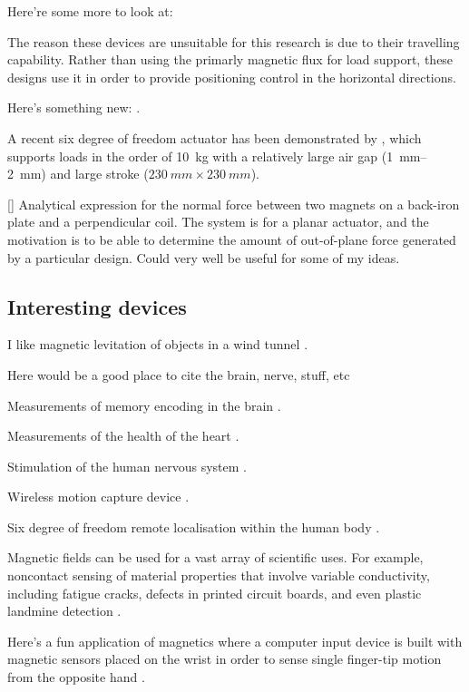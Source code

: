 Here're some more to look at: \textcite{boeij2008,zhang2008a}

The reason these devices are unsuitable for this research is due to their travelling capability.
Rather than using the primarly magnetic flux for load support, these designs use it in order to provide positioning control in the horizontal directions.

Here's something new: \textcite{shameli2008}.

A recent six degree of freedom actuator has been demonstrated by \textcite{jansen2008}, which supports loads in the order of \SI{10}{kg} with a relatively large air gap (\SI{1}{mm}--\SI{2}{mm}) and large stroke ($\SI{230}{mm}\times\SI{230}{mm}$).

[\textcite{dasilveira2005}] Analytical expression for the normal force between two magnets on a back-iron plate and a perpendicular coil.
The system is for a planar actuator, and the motivation is to be able to determine the amount of out-of-plane force generated by a particular design.
Could very well be useful for some of my ideas.

\subsection{Interesting devices}


I like magnetic levitation of objects in a wind tunnel \cite{higuchi2008}.

Here would be a good place to cite the brain, nerve, stuff, etc
\parencite{sekino2005,lu2008,demachi2008}

Measurements of memory encoding in the brain \cite{gjini2005}.

Measurements of the health of the heart \cite{lim2009}.

Stimulation of the human nervous system \cite{darabant2009}.

Wireless motion capture device \cite{hashi2005}.

Six degree of freedom remote localisation within the human body \cite{yang2009-ietm}.

Magnetic fields can be used for a vast array of scientific uses.
For example, noncontact sensing of material properties that involve variable conductivity, including fatigue cracks, defects in printed circuit boards, and even plastic landmine detection \cite{mukhopadhyay2005}.

Here's a fun application of magnetics where a computer input device is built with magnetic sensors placed on the wrist in order to sense single finger-tip motion from the opposite hand \parencite{han2008}.

